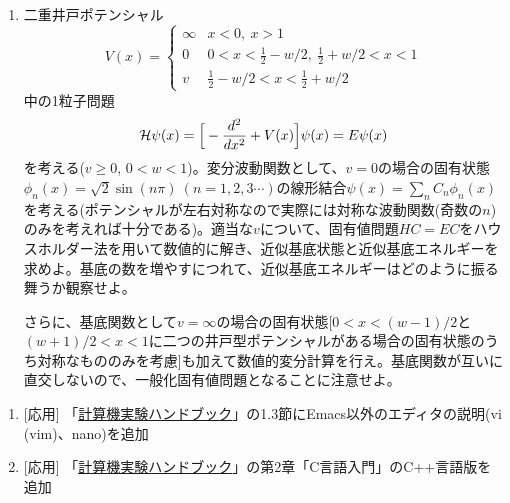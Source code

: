 \documentclass[11pt]{jarticle}
\begin{document}
\begin{enumerate}
\item 二重井戸ポテンシャル
  \begin{equation*}
    V(x) = \begin{cases}
      \infty & x < 0, \ x > 1 \\
      0 & 0 < x < \frac{1}{2} - w/2, \ \frac{1}{2} + w/2 < x < 1 \\
      v & \frac{1}{2} - w/2 < x < \frac{1}{2} + w/2
    \end{cases}
  \end{equation*}
  中の1粒子問題
  \begin{equation*}
    {\cal H} \psi(x) = \Big[ -\frac{d^2}{dx^2} + V(x) \Big] \psi(x) = E \psi(x)
  \end{equation*}
  を考える($v \ge 0$, $0 < w < 1$)。変分波動関数として、$v=0$の場合の固有状態$\phi_n(x) = \sqrt{2} \sin(n \pi) \ (n=1,2,3\cdots)$の線形結合$\psi(x) = \sum_n C_n \phi_n(x)$を考える(ポテンシャルが左右対称なので実際には対称な波動関数(奇数の$n$)のみを考えれば十分である)。適当な$v$について、固有値問題$HC = EC$をハウスホルダー法を用いて数値的に解き、近似基底状態と近似基底エネルギーを求めよ。基底の数を増やすにつれて、近似基底エネルギーはどのように振る舞うか観察せよ。

さらに、基底関数として$v=\infty$の場合の固有状態[$0<x<(w-1)/2$と$(w+1)/2<x<1$に二つの井戸型ポテンシャルがある場合の固有状態のうち対称なもののみを考慮]も加えて数値的変分計算を行え。基底関数が互いに直交しないので、一般化固有値問題となることに注意せよ。

\end{enumerate}

\noindent {\bf [その他]}
\begin{enumerate}
\renewcommand{\labelenumi}{5-\arabic{enumi})}

\item \mbox{} [応用] 「\href{https://github.com/utphys-comp/handbook/releases/download/handbook-2019/handbook.pdf}{計算機実験ハンドブック}」の1.3節にEmacs以外のエディタの説明(vi (vim)、nano)を追加

\item \mbox{} [応用] 「\href{https://github.com/utphys-comp/handbook/releases/download/handbook-2021/handbook.pdf}{計算機実験ハンドブック}」の第2章「C言語入門」のC++言語版を追加

\end{enumerate}  
\end{document}

